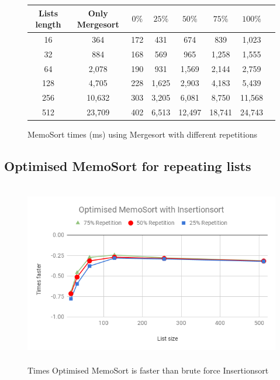 \documentclass[a4paper,12pt]{article}
\begin{document}
\begin{figure}[H]
\centering
\begin{tabular}{|c|c|c|c|c|c|c|c|}  \toprule
	{Lists length} & {Only Mergesort} & {$0\%$} & {$25\%$} & {$50\%$} & {$75\%$} & {$100\%$} \\ \midrule
	16 &364&172&431 & 674 & 839 & 1,023\\ 
	32 &884&168&569 & 965& 1,258& 1,555\\ 
	64 &2,078&190 &931&1,569&2,144&2,759\\ 
	128 &4,705&228&1,625&2,903&4,183&5,439\\ 
	256 &10,632&303&3,205&6,081&8,750&11,568\\ 
	512 &23,709& 402&6,513&12,497&18,741&24,743\\ \bottomrule
\end{tabular}
\caption{MemoSort times (ms) using Mergesort with different repetitions}
\label{fig:MemoSortMergeTable}
\end{figure}

\subsection{Optimised MemoSort for repeating lists}

\begin{figure}[H]
    \centering
    \includegraphics[height=8cm,keepaspectratio]{./images/OptMemoSortIns.png}
    \caption{Times Optimised MemoSort is faster than brute force Insertionsort}
    \label{fig:OptMemoSortInsGraph}
\end{figure}
\end{document}
